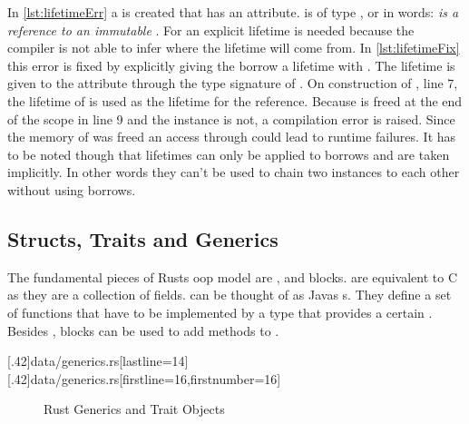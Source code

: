 \documentclass[thesis]{subfiles}
\begin{document}
    In \autoref{lst:lifetimeErr} a \struct \Foo is created that has an attribute.
     is of type , or in words: \emph{ is a reference to an immutable \String}.
    For  an explicit lifetime is needed because the compiler is not able to infer where the lifetime will come from.
    In \autoref{lst:lifetimeFix} this error is fixed by explicitly giving the borrow a lifetime with .
    The lifetime is given to the attribute through the type signature of \Foo.
    On construction of \Foo, line 7, the lifetime of  is used as the lifetime for the reference.
    Because  is freed at the end of the scope in line 9 and the \Foo instance is not, a compilation error is raised.
    Since the memory of  was freed an access through  could lead to runtime failures.
    It has to be noted though that lifetimes can only be applied to borrows and are taken implicitly.
    In other words they can't be used to chain two instances to each other without using borrows\autocite[PhantomData]{rust-doc}.

  \subsection{Structs, Traits and Generics}\label{sec:stg}
    The fundamental pieces of Rusts \gls{oop} model are \structs, \traits and  blocks.
    \structs are equivalent to C \structs as they are a collection of fields.
    \traits can be thought of as Javas s.
    They define a set of functions that have to be implemented by a type that provides a certain \trait.
    Besides \traits,  blocks can be used to add methods to \structs.

    \LstTikzBox{\genericsBase}[.42\linewidth]{data/generics.rs}[lastline=14]
    \LstTikzBox{\genericsCall}[.42\linewidth]{data/generics.rs}[firstline=16,firstnumber=16]
    \begin{figure}[ht]
      \captionsetup{type=lstlisting}
       \hfill%
      \caption{Rust Generics and Trait Objects}\label{lst:generics}
    \end{figure}
\end{document}
